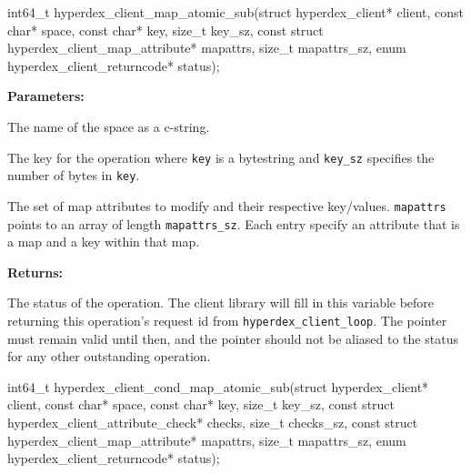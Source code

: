\funcsep
\begin{ccode}
int64_t hyperdex_client_map_atomic_sub(struct hyperdex_client* client,
                const char* space,
                const char* key, size_t key_sz,
                const struct hyperdex_client_map_attribute* mapattrs, size_t mapattrs_sz,
                enum hyperdex_client_returncode* status);
\end{ccode}
\funcdesc 

\noindent\textbf{Parameters:}
\begin{description}[labelindent=\widthof{{\texttt{mapattrs}, \texttt{mapattrs\_sz}}},leftmargin=*,noitemsep,nolistsep,align=right]
\item[\texttt{space}] The name of the space as a c-string.
\item[\texttt{key}, \texttt{key\_sz}] The key for the operation where \texttt{key} is a bytestring and \texttt{key\_sz} specifies the number of bytes in \texttt{key}.
\item[\texttt{mapattrs}, \texttt{mapattrs\_sz}] The set of map attributes to modify and their respective key/values.  \texttt{mapattrs} points to an array of length \texttt{mapattrs\_sz}.  Each entry specify an attribute that is a map and a key within that map.
\end{description}

\noindent\textbf{Returns:}
\begin{description}[labelindent=\widthof{{\texttt{status}}},leftmargin=*,noitemsep,nolistsep,align=right]
\item[\texttt{status}] The status of the operation.  The client library will fill in this variable before returning this operation's request id from \texttt{hyperdex\_client\_loop}.  The pointer must remain valid until then, and the pointer should not be aliased to the status for any other outstanding operation.
\end{description}

\funcsep
\begin{ccode}
int64_t hyperdex_client_cond_map_atomic_sub(struct hyperdex_client* client,
                const char* space,
                const char* key, size_t key_sz,
                const struct hyperdex_client_attribute_check* checks, size_t checks_sz,
                const struct hyperdex_client_map_attribute* mapattrs, size_t mapattrs_sz,
                enum hyperdex_client_returncode* status);
\end{ccode}
\funcdesc 

